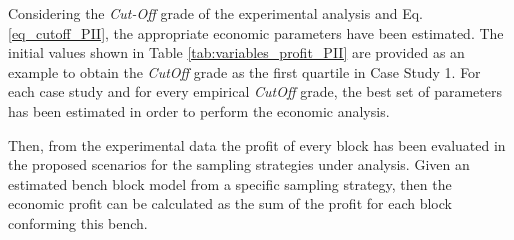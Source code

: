Considering the \emph{Cut-Off} grade of the experimental analysis and Eq. \eqref{eq_cutoff_PII}, the appropriate economic parameters have been estimated. The initial values shown in Table \ref{tab:variables_profit_PII} are provided as an example to obtain the  \emph{CutOff} grade as the first quartile in Case Study 1. For each case study and for every empirical \emph{CutOff} grade, the best set of parameters has been estimated in order to perform the economic analysis. 

Then, from the experimental data the profit of every block has been evaluated in the proposed scenarios for the sampling strategies under analysis. Given an estimated bench block model from a specific sampling strategy, then the economic profit can be calculated as the sum of the profit for each block conforming this bench. 

